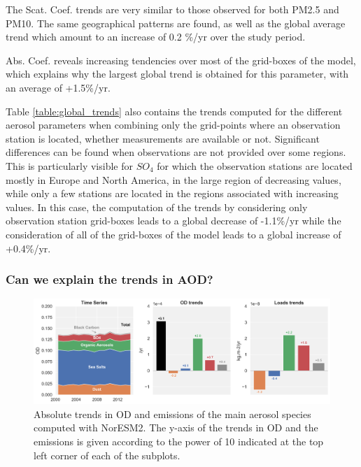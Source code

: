 \documentclass[journal abbreviation, manuscript]{copernicus}
\begin{document}
The Scat. Coef. trends are very similar to those observed for both PM2.5 and PM10. The same geographical patterns are found, as well as the global average trend which amount to an increase of 0.2 \%/yr over the study period.

Abs. Coef. reveals increasing tendencies over most of the grid-boxes of the model, which explains why the largest global trend is obtained for this parameter, with an average of +1.5\%/yr.

Table \ref{table:global_trends} also contains the trends computed for the different aerosol parameters when combining only the grid-points where an observation station is located, whether measurements are available or not. Significant differences can be found when observations are not provided over some regions. This is particularly visible for $SO_{4}$ for which the observation stations are located mostly in Europe and North America, in the large region of decreasing values, while only a few stations are located in the regions associated with increasing values. In this case, the computation of the trends by considering only observation station grid-boxes leads to a global decrease of -1.1\%/yr while the consideration of all of the grid-boxes of the model leads to a global increase of +0.4\%/yr.


\subsubsection{Can we explain the trends in AOD?}

\begin{figure}[t]
 \includegraphics[width=16cm]{../scripts/figs/abs_species_trends.png}
 \caption{Absolute trends in OD and emissions of the main aerosol species computed with NorESM2. The y-axis of the trends in OD and the emissions is given according to the power of 10 indicated at the top left corner of each of the subplots.}
 \label{fig:species}
\end{figure}
\end{document}
